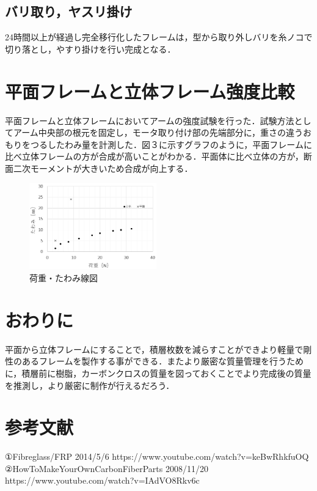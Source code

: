 \documentclass[twocolumn,11pt]{abst}
\begin{document}
\subsection{バリ取り，ヤスリ掛け}
24時間以上が経過し完全移行化したフレームは，型から取り外しバリを糸ノコで切り落とし，やすり掛けを行い完成となる．


\section{平面フレームと立体フレーム強度比較}
平面フレームと立体フレームにおいてアームの強度試験を行った．試験方法としてアーム中央部の根元を固定し，モータ取り付け部の先端部分に，重さの違うおもりをつるしたわみ量を計測した．図３に示すグラフのように，平面フレームに比べ立体フレームの方が合成が高いことがわかる．平面体に比べ立体の方が，断面二次モーメントが大きいため合成が向上する．

\begin{figure}[htbp]
  \begin{center}
    \includegraphics[width=55mm]{img/graph.png}
    \end{center}
  \caption{荷重・たわみ線図}
 \label{fig:a}
\end{figure}

\section{おわりに}
平面から立体フレームにすることで，積層枚数を減らすことができより軽量で剛性のあるフレームを製作する事ができる．またより厳密な質量管理を行うために，積層前に樹脂，カーボンクロスの質量を図っておくことでより完成後の質量を推測し，より厳密に制作が行えるだろう．

\section{参考文献}
①Fibreglass/FRP 2014/5/6
https://www.youtube.com/watch?v=keBwRhkfuOQ
②HowToMakeYourOwnCarbonFiberParts 2008/11/20
https://www.youtube.com/watch?v=IAdVO8Rkv6c
\end{document}
